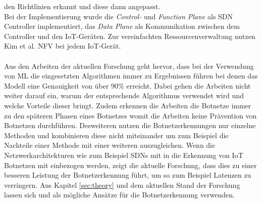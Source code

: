 den Richtlinien erkannt und diese dann angepasst. \\ Bei der Implementierung wurde die \textit{Control-} und \textit{Function Plane} als SDN Controller implementiert, das \textit{Data Plane} als Kommunikation 
zwischen dem Controller und den IoT-Geräten. Zur vereinfachten Ressourcenverwaltung nutzen Kim et al. NFV bei jedem IoT-Gerät. \\ \\ Aus den Arbeiten der aktuellen Forschung geht hervor, dass bei der Verwendung 
von ML die eingesetzten Algorithmen immer zu Ergebnissen führen bei denen das Modell eine Genauigkeit von über 90\% erreicht. Dabei gehen die Arbeiten nicht weiter darauf ein, warum der entsprechende Algorithmus
verwendet wird und welche Vorteile dieser bringt. Zudem erkennen die Arbeiten die Botnetze immer zu den späteren Phasen eines Botnetzes womit die Arbeiten keine Prävention von Botnetzen durchführen. Desweiteren
nutzen die Botnetzerkennungen nur einzelne Methoden und kombinieren diese nicht miteinander um zum Beispiel die Nachteile einer Methode mit einer weiteren auszugleichen. Wenn die Netzwerkarchitekturen wie 
zum Beispiel SDNs mit in die Erkennung von IoT Botnetzen mit einbezogen werden, zeigt die aktuelle Forschung, dass dies zu einer besseren Leistung der Botnetzerkennung führt, um so zum Beispiel Latenzen zu verringern.
Aus Kapitel \ref{sec:theory} und dem aktuellen Stand der Forschung lassen sich \cite{Xing2021SurveyOB} und \cite{Wazzan2021InternetOT} als mögliche Ansätze für die Botnetzerkennung verwenden.

